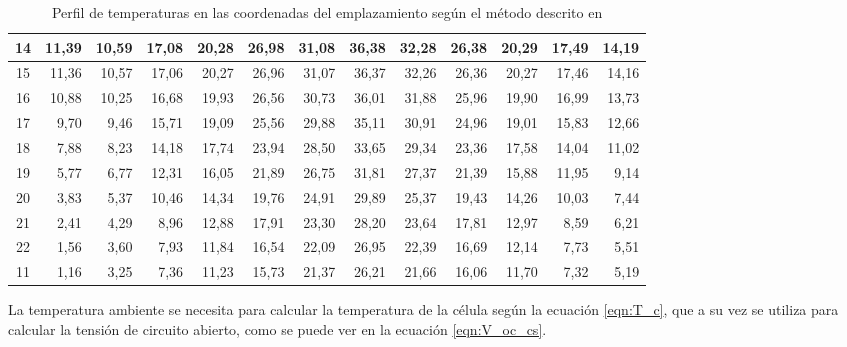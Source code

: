 \begin{table}[ht]
\begin{tabular}{|c|r|r|r|r|r|r|r|r|r|r|r|r|}
14 & 11,39 & 10,59 & 17,08 & 20,28 & 26,98 & 31,08 & 36,38 & 32,28 & 26,38 & 20,29 & 17,49 & 14,19 \\ \hline
15 & 11,36 & 10,57 & 17,06 & 20,27 & 26,96 & 31,07 & 36,37 & 32,26 & 26,36 & 20,27 & 17,46 & 14,16 \\ \hline
16 & 10,88 & 10,25 & 16,68 & 19,93 & 26,56 & 30,73 & 36,01 & 31,88 & 25,96 & 19,90 & 16,99 & 13,73 \\ \hline
17 & 9,70  & 9,46  & 15,71 & 19,09 & 25,56 & 29,88 & 35,11 & 30,91 & 24,96 & 19,01 & 15,83 & 12,66 \\ \hline
18 & 7,88  & 8,23  & 14,18 & 17,74 & 23,94 & 28,50 & 33,65 & 29,34 & 23,36 & 17,58 & 14,04 & 11,02 \\ \hline
19 & 5,77  & 6,77  & 12,31 & 16,05 & 21,89 & 26,75 & 31,81 & 27,37 & 21,39 & 15,88 & 11,95 & 9,14  \\ \hline
20 & 3,83  & 5,37  & 10,46 & 14,34 & 19,76 & 24,91 & 29,89 & 25,37 & 19,43 & 14,26 & 10,03 & 7,44  \\ \hline
21 & 2,41  & 4,29  & 8,96  & 12,88 & 17,91 & 23,30 & 28,20 & 23,64 & 17,81 & 12,97 & 8,59  & 6,21  \\ \hline
22 & 1,56  & 3,60  & 7,93  & 11,84 & 16,54 & 22,09 & 26,95 & 22,39 & 16,69 & 12,14 & 7,73  & 5,51  \\ \hline
11 & 1,16  & 3,25  & 7,36  & 11,23 & 15,73 & 21,37 & 26,21 & 21,66 & 16,06 & 11,70 & 7,32  & 5,19  \\ \hline
\end{tabular}
\caption{Perfil de temperaturas en las coordenadas del emplazamiento según el método descrito en \cite{temp_paper} \label{tab:temp_profiles}}
\end{table}

La temperatura ambiente se necesita para calcular la temperatura de la célula según la ecuación \ref{eqn:T_c}, que a su vez se utiliza para calcular la tensión de circuito abierto, como se puede ver en la ecuación \ref{eqn:V_oc_cs}.



